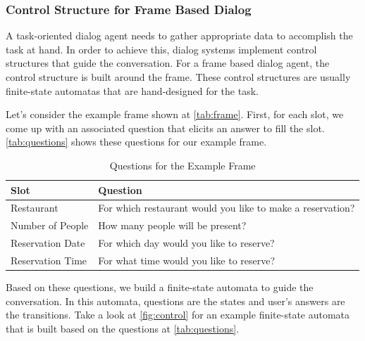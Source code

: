 \subsubsection{Control Structure for Frame Based Dialog}
A task-oriented dialog agent needs to gather appropriate data to accomplish the task at hand.
In order to achieve this, dialog systems implement control structures that guide the conversation.
For a frame based dialog agent, the control structure is built around the frame.
These control structures are usually finite-state automatas that are hand-designed for the task. 

Let's consider the example frame shown at \autoref{tab:frame}.
First, for each slot, we come up with an associated question that elicits an answer to fill the slot.
\autoref{tab:questions} shows these questions for our example frame.

\begin{table}[htbp]
  \caption[Questions for the Example Frame]{Questions for the Example Frame}\label{tab:questions}
  \centering
  \begin{tabular}{l|l}
    Slot&Question\\ \toprule
    Restaurant&For which restaurant would you like to make a reservation?\\ \hline
    Number of People&How many people will be present?\\ \hline
    Reservation Date&For which day would you like to reserve?\\ \hline
    Reservation Time&For what time would you like to reserve?\\ \hline
  \end{tabular}
\end{table}

Based on these questions, we build a finite-state automata to guide the conversation.
In this automata, questions are the states and user's answers are the transitions.
Take a look at \autoref{fig:control} for an example finite-state automata that is built based on the questions at \autoref{tab:questions}.

